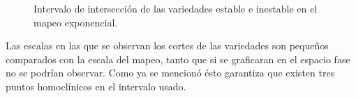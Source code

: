 \begin{figure}[htbp]
\centering
{}
\caption{Intervalo de intersección de las variedades estable e inestable en el mapeo exponencial.} \label{cruces_jung}
\end{figure}










Las escalas en las que se observan los cortes de las variedades son pequeños comparados con la escala del mapeo, tanto que si se graficaran en el espacio fase no se podrían observar. Como ya se mencionó ésto garantiza que existen tres puntos homoclínicos en el intervalo usado. \\




